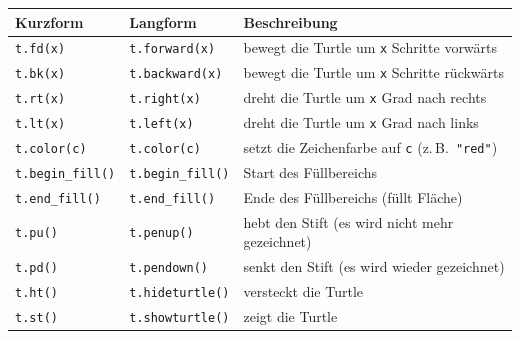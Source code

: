 \begin{myoverview}
	\begin{table}[H]
		\centering
		\begin{tabular}{lll}
			\midrule
			\textbf{Kurzform}            & \textbf{Langform}            & \textbf{Beschreibung}                                                                                   \\
			\midrule
			\lstinline|t.fd(x)|          & \lstinline|t.forward(x)|     & bewegt die Turtle um \lstinline|x| Schritte vorwärts                                                    \\
			\lstinline|t.bk(x)|          & \lstinline|t.backward(x)|    & bewegt die Turtle um \lstinline|x| Schritte rückwärts                                                   \\
			\lstinline|t.rt(x)|          & \lstinline|t.right(x)|       & dreht die Turtle um \lstinline|x| Grad nach rechts                                                      \\
			\lstinline|t.lt(x)|          & \lstinline|t.left(x)|        & dreht die Turtle um \lstinline|x| Grad nach links                                                       \\
			\lstinline|t.color(c)|       & \lstinline|t.color(c)|       & setzt die Zeichenfarbe auf \lstinline|c| (z.\,B.\ \lstinline|"red"|)                                    \\
			\lstinline|t.begin_fill()|   & \lstinline|t.begin_fill()|   & Start des Füllbereichs                                                                                  \\
			\lstinline|t.end_fill()|     & \lstinline|t.end_fill()|     & Ende des Füllbereichs (füllt Fläche)                                                                    \\
			\lstinline|t.pu()|           & \lstinline|t.penup()|        & hebt den Stift (es wird nicht mehr gezeichnet)                                                          \\
			\lstinline|t.pd()|           & \lstinline|t.pendown()|      & senkt den Stift (es wird wieder gezeichnet)                                                             \\
			\lstinline|t.ht()|           & \lstinline|t.hideturtle()|   & versteckt die Turtle                                                                                    \\
			\lstinline|t.st()|           & \lstinline|t.showturtle()|   & zeigt die Turtle                                                                                        \\

\end{tabular}
\end{table}
\end{myoverview}
